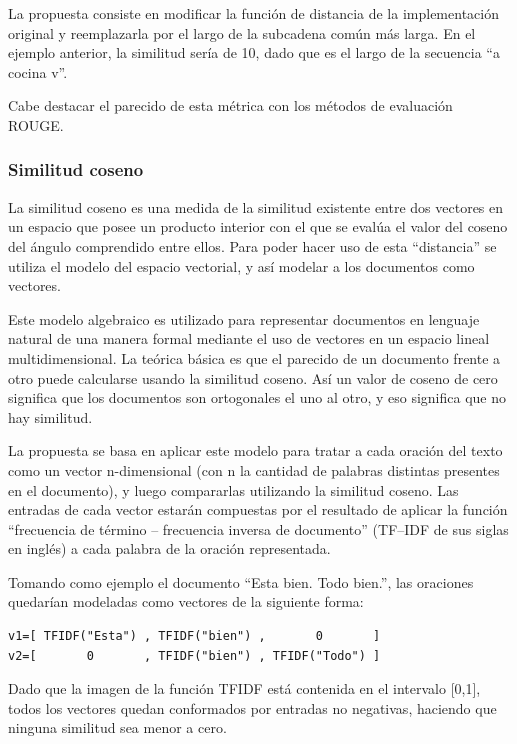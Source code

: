 \documentclass{llncs}
\begin{document}
La propuesta consiste en modificar la función de distancia de la implementación original y reemplazarla por el largo de la subcadena común más larga. En el ejemplo anterior, la similitud sería de 10, dado que es el largo de la secuencia “a cocina v”.

Cabe destacar el parecido de esta métrica con los métodos de evaluación ROUGE.


\subsubsection{Similitud coseno}
La similitud coseno es una medida de la similitud existente entre dos vectores en un espacio que posee un producto interior con el que se evalúa el valor del coseno del ángulo comprendido entre ellos. Para poder hacer uso de esta “distancia” se utiliza el modelo del espacio vectorial, y así modelar a los documentos como vectores.

Este modelo algebraico es utilizado para representar documentos en lenguaje natural de una manera formal mediante el uso de vectores en un espacio lineal multidimensional. La teórica básica es que el parecido de un documento frente a otro puede calcularse usando la similitud coseno. Así un valor de coseno de cero significa que los documentos son ortogonales el uno al otro, y eso significa que no hay similitud.

La propuesta se basa en aplicar este modelo para tratar a cada oración del texto como un vector n-dimensional (con n la cantidad de palabras distintas presentes en el documento), y luego compararlas utilizando la similitud coseno. Las entradas de cada vector estarán compuestas por el resultado de aplicar la función “frecuencia de término -- frecuencia inversa de documento” (TF--IDF de sus siglas en inglés) a cada palabra de la oración representada.

Tomando como ejemplo el documento “Esta bien. Todo bien.”, las oraciones quedarían modeladas como vectores de la siguiente forma:

\begin{Verbatim}[xleftmargin=3em]
v1=[ TFIDF("Esta") , TFIDF("bien") ,       0       ]
v2=[       0       , TFIDF("bien") , TFIDF("Todo") ]
\end{Verbatim}

Dado que la imagen de la función TFIDF está contenida en el intervalo [0,1], todos los vectores quedan conformados por entradas no negativas, haciendo que ninguna similitud sea menor a cero. 
\end{document}
